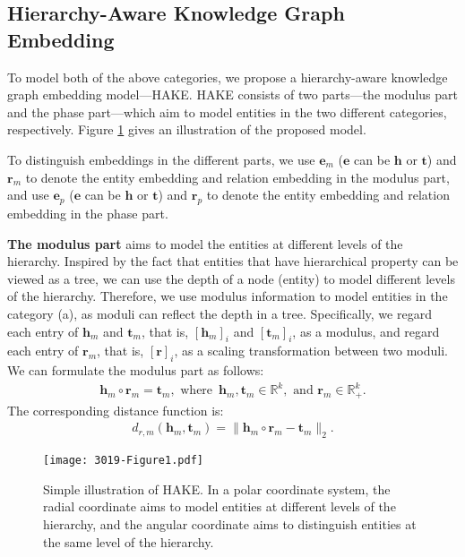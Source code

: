 \documentclass[letterpaper]{article} \usepackage{aaai20}  \usepackage{times}  \usepackage{helvet} \usepackage{courier}  \usepackage[hyphens]{url}  \usepackage{graphicx} \urlstyle{rm} \def\UrlFont{\rm}  \usepackage{graphicx}  \frenchspacing  \setlength{\pdfpagewidth}{8.5in}  \setlength{\pdfpageheight}{11in}
\begin{document}
\subsection{Hierarchy-Aware Knowledge Graph Embedding}
To model both of the above categories, we propose a hierarchy-aware knowledge graph embedding model---HAKE. HAKE consists of two parts---the modulus part and the phase part---which aim to model entities in the two different categories, respectively. Figure \ref{fig:mode_illustration} gives an illustration of the proposed model.

To distinguish embeddings in the different parts, we use $\textbf{e}_m$ ($\textbf{e}$ can be $\textbf{h}$ or $\textbf{t}$) and $\textbf{r}_m$ to denote the entity embedding and relation embedding in the modulus part, and use $\textbf{e}_p$ ($\textbf{e}$ can be $\textbf{h}$ or $\textbf{t}$) and $\textbf{r}_p$ to denote the entity embedding and relation embedding in the phase part.

\textbf{The modulus part} aims to model the entities at different levels of the hierarchy. Inspired by the fact that entities that have hierarchical property can be viewed as a tree, we can use the depth of a node (entity) to model different levels of the hierarchy. Therefore, we use modulus information to model entities in the category (a), as moduli can reflect the depth in a tree. Specifically, we regard each entry of $\textbf{h}_m$ and $\textbf{t}_m$, that is, $[\textbf{h}_m]_i$ and $[\textbf{t}_m]_i$, as a modulus, and regard each entry of $\textbf{r}_m$, that is, $[\textbf{r}]_i$, as a scaling transformation between two moduli. We can formulate the modulus part as follows:
\begin{align*}
    \textbf{h}_m\circ \textbf{r}_m=\textbf{t}_m, \text{ where }\,\textbf{h}_m, \textbf{t}_m\in\mathbb{R}^k, \text{ and } \textbf{r}_m\in\mathbb{R}_+^k.
\end{align*}
The corresponding distance function is:
\begin{align*}
    d_{r,m}(\textbf{h}_m, \textbf{t}_m)=\|\textbf{h}_m\circ \textbf{r}_m-\textbf{t}_m\|_2.
\end{align*}

\begin{figure}[ht]
  \centering \texttt{[image: 3019-Figure1.pdf]}
\caption{Simple illustration of HAKE. In a polar coordinate system, the radial coordinate aims to model entities at different levels of the hierarchy, and the angular coordinate aims to distinguish entities at the same level of the hierarchy.}
\label{fig:mode_illustration}
\end{figure}
\end{document}
